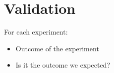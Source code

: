 \chapter{Validation}
\label{validation}
For each experiment:
\begin{itemize}
    \item Outcome of the experiment
    \item Is it the outcome we expected?
\end{itemize}